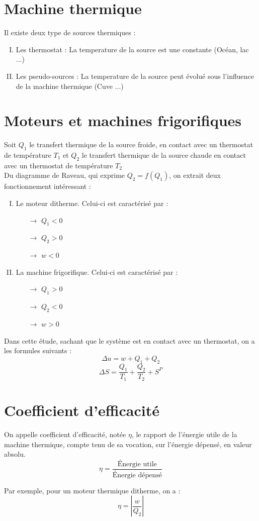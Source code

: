 \section{Machine thermique}
Il existe deux type de sources thermiques : 
\begin{enumerate}[I) ]
 \item Les thermostat : La temperature de la source est une constante (Océan, lac ...)
 \item Les pseudo-sources : La temperature de la source peut évolué sous l'influence de la machine thermique (Cuve ...)
\end{enumerate}
\section{Moteurs et machines frigorifiques}
Soit $Q_1$ le transfert thermique de la source froide, en contact avec un thermostat de température $T_1$ et $Q_2$ le transfert thermique de la source chaude en contact avec un thermostat de température $T_2$\\
Du diagramme de Raveau, qui exprime $Q_2=f(Q_1)$, on extrait deux fonctionnement intéressant :
\begin{enumerate}[I) ]
 \item Le moteur ditherme. Celui-ci est caractérisé par : 
 \begin{itemize}
 \item[$\rightarrow$] $Q_1 < 0$
 \item[$\rightarrow$] $Q_2 > 0$
 \item[$\rightarrow$] $w < 0$
\end{itemize}
 \item La machine frigorifique. Celui-ci est caractérisé par :
\begin{itemize}
 \item[$\rightarrow$] $Q_1 > 0$
 \item[$\rightarrow$] $Q_2 < 0$
 \item[$\rightarrow$] $w > 0$
\end{itemize}
\end{enumerate}
Dans cette étude, sachant que le système est en contact avec un thermostat, on a les formules suivants :
$$\Delta u = w + Q_1 + Q_2$$
$$\Delta S = \dfrac{Q_1}{T_1} + \dfrac{Q_2}{T_2} + S^P $$
\section{Coefficient d'efficacité}
\begin{de}
 On appelle coefficient d'efficacité, notée $\eta$, le rapport de l'énergie utile de la machine thermique, compte tenu de sa vocation, sur l'énergie dépensé, en valeur absolu.
$$\eta = \dfrac{\mbox{Énergie utile}}{\mbox{Énergie dépensé}}$$
\end{de}
Par exemple, pour un moteur thermique ditherme, on a : 
$$\eta = \left\vert\dfrac{w}{Q_2}\right\vert$$

